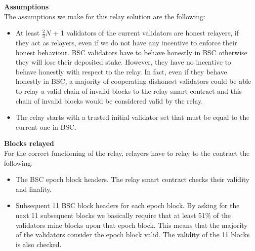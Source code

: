 \noindent
\textbf{Assumptions}\\
The assumptions we make for this relay solution are the following: 
\begin{itemize}
	\item At least $\frac{2}{3}N$ + 1 validators of the current validators are honest relayers, if they act as relayers, even if we do not have any incentive to enforce their honest behaviour. BSC validators have to behave honestly in BSC otherwise they will lose their deposited stake. However, they have no incentive to behave honestly with respect to the relay. In fact, even if they behave honestly in BSC, a majority of cooperating dishonest validators could be able to relay a valid chain of invalid blocks to the relay smart contract and this chain of invalid blocks would be considered valid by the relay. 
	\item The relay starts with a trusted initial validator set that must be equal to the current one in BSC.
\end{itemize}
\noindent
\textbf{Blocks relayed}\\
For the correct functioning of the relay, relayers have to relay to the contract the following:  
\begin{itemize}
	\item The BSC epoch block headers. The relay smart contract checks their validity and finality.%
	\item Subsequent 11 BSC block headers for each epoch block. By asking for the next 11 subsequent blocks we basically require that at least 51\% of the validators mine blocks upon that epoch block. This means that the majority of the validators consider the epoch block valid. The validity of the 11 blocks is also checked.
\end{itemize}
